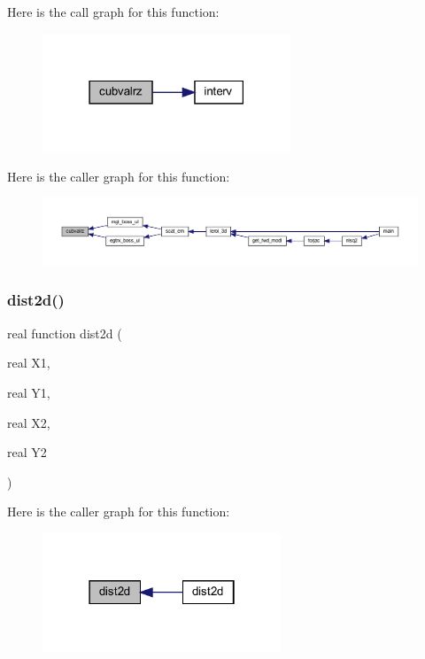 Here is the call graph for this function\+:\nopagebreak
\begin{figure}[H]
\begin{center}
\leavevmode
\includegraphics[width=210pt]{Leroi_8f90_a7ac3bb5f2b2d31402aa81424ee2be857_cgraph}
\end{center}
\end{figure}
Here is the caller graph for this function\+:\nopagebreak
\begin{figure}[H]
\begin{center}
\leavevmode
\includegraphics[width=350pt]{Leroi_8f90_a7ac3bb5f2b2d31402aa81424ee2be857_icgraph}
\end{center}
\end{figure}
\mbox{\label{Leroi_8f90_a173fbca69518ee77703afb9c67d3e4f0}} 
\subsubsection{\texorpdfstring{dist2d()}{dist2d()}}
{\footnotesize\ttfamily real function dist2d (\begin{DoxyParamCaption}\item[{real}]{X1,  }\item[{real}]{Y1,  }\item[{real}]{X2,  }\item[{real}]{Y2 }\end{DoxyParamCaption})}

Here is the caller graph for this function\+:\nopagebreak
\begin{figure}[H]
\begin{center}
\leavevmode
\includegraphics[width=202pt]{Leroi_8f90_a173fbca69518ee77703afb9c67d3e4f0_icgraph}
\end{center}
\end{figure}
\mbox{\label{Leroi_8f90_a728fa0fc652b63cee1eb0d408bbac553}} 
